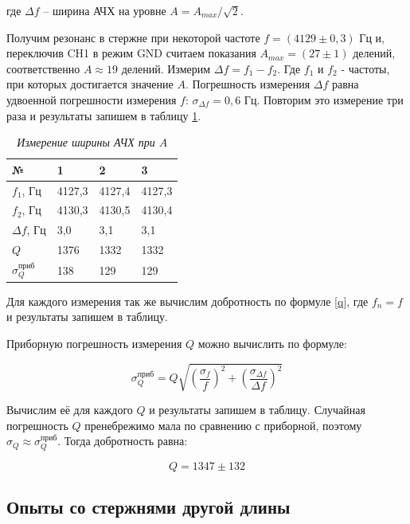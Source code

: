 \documentclass[a4paper,12pt]{article}
\begin{document}
где $\Delta f$ -- ширина АЧХ на уровне $A = A_{max}/\sqrt{2}$. 

Получим резонанс в стержне при некоторой частоте $f = (4129 \pm 0,3)$ Гц и, переключив CH1 в режим GND считаем показания $A_{max} = (27 \pm 1)$ делений, соответственно $A \approx 19$ делений. Измерим $\Delta f = f_1 - f_2$. Где $f_1$ и $f_2$ - частоты, при которых достигается значение $A$. Погрешность измерения $\Delta f$ равна удвоенной погрешности измерения $f$: $\sigma_{\Delta f} = 0,6$ Гц. Повторим это измерение три раза и результаты запишем в таблицу \ref{width-A}.

\begin{table}[!ht]
    \centering
    \begin{tabular}{|l|l|l|l|}
    \hline
        № & 1 & 2 & 3 \\ \hline
        $f_1$, Гц & 4127,3 & 4127,4 & 4127,3 \\ \hline
        $f_2$, Гц  & 4130,3 & 4130,5 & 4130,4 \\ \hline
        $\Delta f$, Гц & 3,0 & 3,1 & 3,1 \\ \hline
        $Q$ & 1376 & 1332 & 1332 \\ \hline
        $\sigma_Q^\text{приб}$ & 138 & 129 & 129 \\ \hline
    \end{tabular}\caption{\textit{Измерение ширины АЧХ при $A$}}\label{width-A}
\end{table}


Для каждого измерения так же вычислим добротность по формуле \eqref{q}, где $f_n = f$ и результаты запишем в таблицу.

Приборную погрешность измерения $Q$ можно вычислить по формуле:

\begin{equation}
    \sigma_Q^\text{приб} = Q \sqrt{\left ( \frac{\sigma_f}{f} \right )^2 + \left ( \frac{\sigma_{\Delta f}}{\Delta f} \right )^2 }
\end{equation}

Вычислим её для каждого $Q$ и результаты запишем в таблицу. Случайная погрешность $Q$ пренебрежимо мала по сравнению с приборной, поэтому $\sigma_Q \approx \sigma_Q^\text{приб}$. Тогда добротность равна:

\begin{equation}
    Q = 1347 \pm 132
\end{equation}

\subsection{Опыты со стержнями другой длины}
\end{document}
